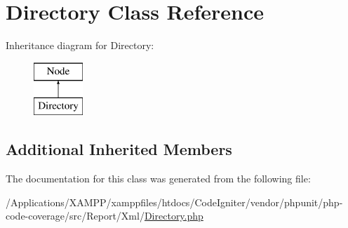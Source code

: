 \hypertarget{class_sebastian_bergmann_1_1_code_coverage_1_1_report_1_1_xml_1_1_directory}{}\section{Directory Class Reference}
\label{class_sebastian_bergmann_1_1_code_coverage_1_1_report_1_1_xml_1_1_directory}
Inheritance diagram for Directory\+:\begin{figure}[H]
\begin{center}
\leavevmode
\includegraphics[height=2.000000cm]{class_sebastian_bergmann_1_1_code_coverage_1_1_report_1_1_xml_1_1_directory}
\end{center}
\end{figure}
\subsection*{Additional Inherited Members}


The documentation for this class was generated from the following file\+:\begin{DoxyCompactItemize}
\item 
/\+Applications/\+X\+A\+M\+P\+P/xamppfiles/htdocs/\+Code\+Igniter/vendor/phpunit/php-\/code-\/coverage/src/\+Report/\+Xml/\mbox{\hyperlink{_report_2_xml_2_directory_8php}{Directory.\+php}}\end{DoxyCompactItemize}
